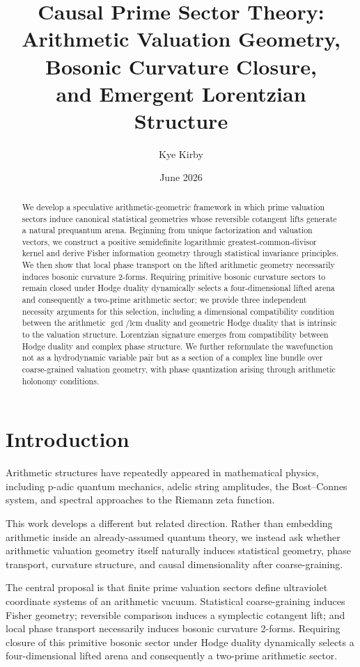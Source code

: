 \documentclass[11pt]{article}
\title{\textbf{Causal Prime Sector Theory:\\
Arithmetic Valuation Geometry, Bosonic Curvature Closure,\\
and Emergent Lorentzian Structure}}
\author{Kye Kirby}
\date{June 2026}
\begin{document}
\maketitle

\begin{abstract}
We develop a speculative arithmetic-geometric framework in which prime valuation sectors induce canonical statistical geometries whose reversible cotangent lifts generate a natural prequantum arena. Beginning from unique factorization and valuation vectors, we construct a positive semidefinite logarithmic greatest-common-divisor kernel and derive Fisher information geometry through statistical invariance principles. We then show that local phase transport on the lifted arithmetic geometry necessarily induces bosonic curvature 2-forms. Requiring primitive bosonic curvature sectors to remain closed under Hodge duality dynamically selects a four-dimensional lifted arena and consequently a two-prime arithmetic sector; we provide three independent necessity arguments for this selection, including a dimensional compatibility condition between the arithmetic $\gcd/\mathrm{lcm}$ duality and geometric Hodge duality that is intrinsic to the valuation structure. Lorentzian signature emerges from compatibility between Hodge duality and complex phase structure. We further reformulate the wavefunction not as a hydrodynamic variable pair but as a section of a complex line bundle over coarse-grained valuation geometry, with phase quantization arising through arithmetic holonomy conditions.
\end{abstract}

\tableofcontents
\newpage

\section{Introduction}

Arithmetic structures have repeatedly appeared in mathematical physics, including p-adic quantum mechanics, adelic string amplitudes, the Bost--Connes system, and spectral approaches to the Riemann zeta function.

This work develops a different but related direction. Rather than embedding arithmetic inside an already-assumed quantum theory, we instead ask whether arithmetic valuation geometry itself naturally induces statistical geometry, phase transport, curvature structure, and causal dimensionality after coarse-graining.

The central proposal is that finite prime valuation sectors define ultraviolet coordinate systems of an arithmetic vacuum. Statistical coarse-graining induces Fisher geometry; reversible comparison induces a symplectic cotangent lift; and local phase transport necessarily induces bosonic curvature 2-forms. Requiring closure of this primitive bosonic sector under Hodge duality dynamically selects a four-dimensional lifted arena and consequently a two-prime arithmetic sector.
\end{document}
